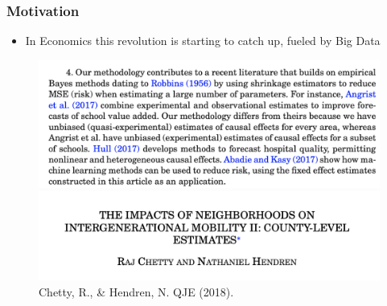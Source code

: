 \documentclass[
  shownotes,
  xcolor={svgnames},
  hyperref={colorlinks,citecolor=DarkBlue,linkcolor=DarkRed,urlcolor=DarkBlue}
  , aspectratio=169]{beamer}
\begin{document}
\begin{frame}[fragile]
\frametitle{Motivation}

\begin{itemize}
\item In Economics this revolution is starting to catch up, fueled by Big Data
\end{itemize}

\begin{figure}[H] \centering
  \centering
  \includegraphics[scale=0.4]{figures/Chetty_n_Hendren_QJE_1.png}
  \includegraphics[scale=0.4]{figures/Chetty_n_Hendren_QJE_2.png}
  \\
  \tiny Chetty, R., \& Hendren, N. QJE (2018). 
\end{figure}

\end{frame}
\end{document}
